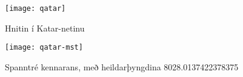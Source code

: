 \documentclass{article}
\begin{document}
\begin{figure}[h]
\caption{Hnitin í Katar-netinu}
\begin{center}
\texttt{[image: qatar]}
\end{center}
\end{figure}

\begin{figure}
\caption{Spanntré kennarans, með heildarþyngdina 8028.0137422378375}
\begin{center}
\texttt{[image: qatar-mst]}
\end{center}
\end{figure}

\end{document}
